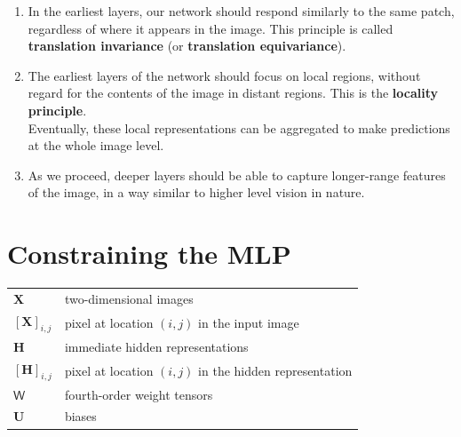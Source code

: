 \begin{enumerate}
    \item In the earliest layers, our network should respond similarly to the same patch, regardless of where it appears in the image. This principle is called \textbf{translation invariance} (or \textbf{translation equivariance}).

    \item The earliest layers of the network should focus on local regions, without regard for the contents of the image in distant regions. This is the \textbf{locality principle}.\\
    Eventually, these local representations can be aggregated to make predictions at the whole image level.

    \item As we proceed, deeper layers should be able to capture longer-range features of the image, in a way similar to higher level vision in nature.

\end{enumerate}



\section{Constraining the MLP \cite{dnn-1}}

\begin{customTableWrapper}{1.5}
\begin{table}[H]
    \centering
    \begin{tabular}{l p{8cm}}
        $\mathbf{X}$ & two-dimensional images \\
        $[\mathbf{X}]_{i, j}$ & pixel at location $(i,j)$ in the input image \\

        $\mathbf{H}$ & immediate hidden representations \\
        $[\mathbf{H}]_{i, j}$ & pixel at location $(i,j)$ in the hidden representation \\

        $\mathsf{W}$ & fourth-order weight tensors \\
        $\mathbf{U}$ & biases \\
    \end{tabular}
\end{table}
\end{customTableWrapper}


